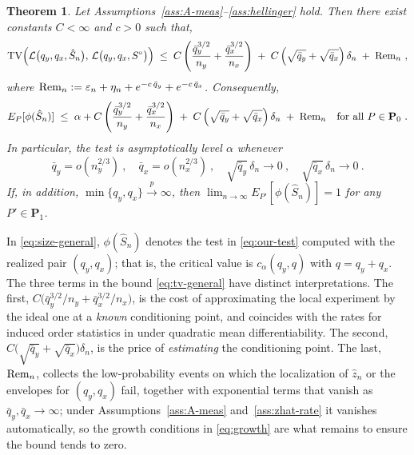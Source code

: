 \documentclass[11pt]{article}
\numberwithin{equation}{section}
\newtheorem{theorem}{Theorem}%
\begin{document}
\begin{theorem}\label{thm:large-q-general}
Let Assumptions~\ref{ass:A-meas}--\ref{ass:hellinger} hold. Then there exist constants $C<\infty$ and $c>0$ such that,
\begin{equation}\label{eq:tv-general}
 \mathrm{TV}\Big( \mathcal L\big(q_y,q_x,\hat S_n\big),\, \mathcal L\big(q_y,q_x,S^{\circ}\big) \Big) \;\le\; C\left( \frac{\bar q_y^{3/2}}{n_y}+\frac{\bar q_x^{3/2}}{n_x} \right) \;+\; C\left( \sqrt{\bar q_y}+\sqrt{\bar q_x} \right)\delta_n \;+\; {\rm Rem}_n ~,
\end{equation}
where ${\rm Rem}_n := \varepsilon_n+\eta_n+e^{-c\,\bar q_y}+e^{-c\,\bar q_x}$. Consequently, 
\begin{equation}\label{eq:size-general}
 E_P[\phi(\hat S_n)] \;\le\; \alpha + C\left( \frac{\bar q_y^{3/2}}{n_y}+\frac{\bar q_x^{3/2}}{n_x} \right) \;+\; C\left( \sqrt{\bar q_y}+\sqrt{\bar q_x} \right)\delta_n \;+\; {\rm Rem}_n \quad\text{for all } P\in\mathbf P_0~.
\end{equation}
In particular, the test is asymptotically level $\alpha$ whenever
\begin{equation}\label{eq:growth}
 \bar q_y=o(n_y^{2/3})~,\quad \bar q_x=o(n_x^{2/3})~,\quad \sqrt{\bar q_y}\,\delta_n\to0~,\quad \sqrt{\bar q_x}\,\delta_n\to0~.
\end{equation}
If, in addition, $\min\{q_y,q_x\}\overset{p}{\to}\infty$, then $\lim_{n\to\infty}E_{P'}[\phi(\hat S_n)]=1$ for any $P'\in\mathbf P_1$.
\end{theorem}


In \eqref{eq:size-general}, $\phi(\hat S_n)$ denotes the test in \eqref{eq:our-test} computed with the realized pair $(q_y,q_x)$; that is, the critical value is $c_\alpha(q_y,q)$ with $q=q_y+q_x$. The three terms in the bound \eqref{eq:tv-general} have distinct interpretations. The first, $C\big(\bar q_y^{3/2}/n_y+\bar q_x^{3/2}/n_x\big)$, is the cost of approximating the local experiment by the ideal one at a \emph{known} conditioning point, and coincides with the rates for induced order statistics in \citet{bugni/canay/kim:26b} under quadratic mean differentiability. The second, $C\big(\sqrt{\bar q_y}+\sqrt{\bar q_x}\big)\delta_n$, is the price of \emph{estimating} the conditioning point. The last, ${\rm Rem}_n$, collects the low-probability events on which the localization of $\hat z_n$ or the envelopes for $(q_y,q_x)$ fail, together with exponential terms that vanish as $\bar q_y,\bar q_x\to\infty$; under Assumptions~\ref{ass:A-meas} and~\ref{ass:zhat-rate} it vanishes automatically, so the growth conditions in \eqref{eq:growth} are what remains to ensure the bound tends to zero.
\end{document}
